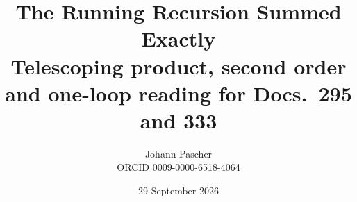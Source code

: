 \documentclass[11pt,a4paper]{report}
\title{The Running Recursion Summed Exactly\\[0.5em]
  \large Telescoping product, second order and one-loop reading for Docs.~295 and 333}
\date{29 September 2026}
\author{Johann Pascher\\\small ORCID 0009-0000-6518-4064}
\begin{document}
\renewcommand{\thechapter}{}
\renewcommand{\thesection}{\arabic{section}}
\maketitle
\tableofcontents

\end{document}
